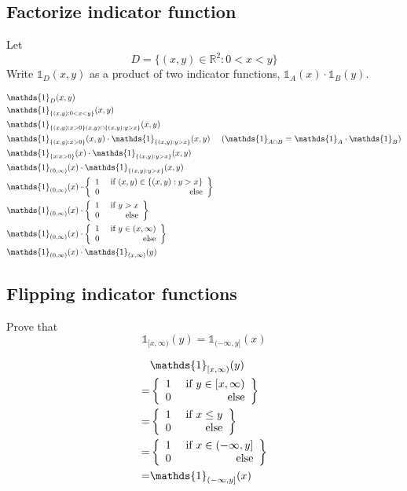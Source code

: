 \documentclass{article}
\begin{document}
\subsection{Factorize indicator function}

\begin{sproblem}
Let
\[D = \{(x,y)\in \mathbb{R}^2 : 0 < x < y\}\]
Write \(\mathds{1}_D(x,y)\) as a product of two indicator functions,
\(\mathds{1}_A(x) \cdot \mathds{1}_B(y)\).
\end{sproblem}

\begin{ssolution}
\begin{align*}
	& \mathds{1}_D(x,y) \\
	& \mathds{1}_{\{(x,y): 0<x<y\}}(x,y) \\
	& \mathds{1}_{\{(x,y): x>0\}(x,y) \cap \{(x,y): y>x\}}(x,y) \\
	& \mathds{1}_{\{(x,y): x>0\}}(x,y) \cdot \mathds{1}_{\{(x,y): y>x\}}(x,y) & (\mathds{1}_{A \cap B} = \mathds{1}_A \cdot \mathds{1}_B) \\
	& \mathds{1}_{\{x: x>0\}}(x) \cdot \mathds{1}_{\{(x,y): y>x\}}(x,y) \\
	& \mathds{1}_{(0,\infty)}(x) \cdot \mathds{1}_{\{(x,y): y>x\}}(x,y) \\
	& \mathds{1}_{(0,\infty)}(x) \cdot \casesii{1}{(x,y) \in \{(x,y):y>x\}}{0} \\
	& \mathds{1}_{(0,\infty)}(x) \cdot \casesii{1}{y>x}{0} \\
	& \mathds{1}_{(0,\infty)}(x) \cdot \casesii{1}{y \in (x,\infty)}{0} \\
	& \mathds{1}_{(0,\infty)}(x) \cdot \mathds{1}_{(x,\infty)}(y)
\end{align*}
\end{ssolution}

\subsection{Flipping indicator functions}

\begin{sproblem}
Prove that
\[\mathds{1}_{[x,\infty)}(y) = \mathds{1}_{(-\infty,y]}(x)\]
\end{sproblem}

\begin{ssolution}
\begin{align*}
	& \mathds{1}_{[x,\infty)}(y) \\
	=& \casesii{1}{y\in [x,\infty)}{0} \\
	=& \casesii{1}{x \leq y}{0} \\
	=& \casesii{1}{x \in (-\infty,y]}{0} \\
	=& \mathds{1}_{(-\infty,y]}(x)
\end{align*}
\end{ssolution}
\end{document}
